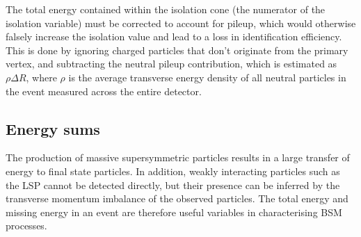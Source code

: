 The total energy contained within the isolation cone (the numerator of the 
isolation variable) must be corrected to account for pileup, which would 
otherwise falsely increase the isolation value and lead to a loss in 
identification efficiency. This is done by ignoring charged particles that 
don't originate from the primary vertex, and subtracting the neutral pileup 
contribution, which is estimated as $\rho \Delta R$, where $\rho$ is the 
average transverse energy density of all neutral particles in the event 
measured across the entire detector.




\subsection{Energy sums}
\label{sec:detector-energysums}
The production of massive supersymmetric 
particles results in a large transfer of energy to final state particles. 
In addition, weakly interacting particles such as the LSP cannot be detected 
directly, but their presence can be inferred by the transverse momentum 
imbalance of the observed particles. The total energy and missing energy in an 
event are therefore useful variables in characterising BSM processes. 

